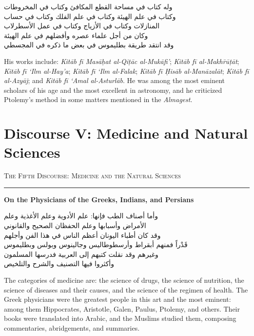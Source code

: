\documentclass[11pt,a4paper]{article}
\newcommand{\ar}[1]{{\arabicfont\beginR #1\endR}}
\newcommand{\bilingual}[2]{%
  \noindent
  \begin{minipage}[t]{0.47\textwidth}
    \vspace{0pt}
    \begin{flushright}
    {\arabicfont\beginR #1\endR}
    \end{flushright}
  \end{minipage}%
  \hfill\vline\hfill
  \begin{minipage}[t]{0.47\textwidth}
    \vspace{0pt}
    #2
  \end{minipage}%
  \par\vspace{0.8em}
}
\newcommand{\bilingualsection}[2]{%
  \vspace{1em}%
  \noindent
  \begin{minipage}[t]{0.47\textwidth}
    \begin{flushright}
    \textsc{\color{sectioncolor}\ar{#1}}
    \end{flushright}
  \end{minipage}%
  \hfill
  \begin{minipage}[t]{0.47\textwidth}
    \textsc{\color{sectioncolor}#2}
  \end{minipage}%
  \par\vspace{0.5em}\hrule\vspace{0.8em}%
}
\newcommand{\bilingualsubsection}[2]{%
  \vspace{0.6em}%
  \noindent
  \begin{minipage}[t]{0.47\textwidth}
    \begin{flushright}
    \textbf{\color{sectioncolor}\ar{#1}}
    \end{flushright}
  \end{minipage}%
  \hfill
  \begin{minipage}[t]{0.47\textwidth}
    \textbf{\color{sectioncolor}#2}
  \end{minipage}%
  \par\vspace{0.4em}%
}
\begin{document}
\vspace{0.5em}
\bilingual
{وله كتاب في مساحة القطع المكافئ وكتاب في المخروطات\\
وكتاب في علم الهيئة وكتاب في علم الفلك وكتاب في حساب\\
المنازلات وكتاب في الأزياج وكتاب في عمل الأسطرلاب\\
وكان من أجل علماء عصره وأفضلهم في علم الهيئة\\
وقد انتقد طريقة بطليموس في بعض ما ذكره في المجسطي}
{His works include: \textit{Kit\=ab f\=i Mas\=a\d{h}at al-Qi\d{t}\={a}c
al-Muk\=afi'}; \textit{Kit\=ab f\=i al-Makh\=r\=u\d{t}\=at};
\textit{Kit\=ab f\=i \textquoteleft Ilm al-Hay'a}; \textit{Kit\=ab f\=i
\textquoteleft Ilm al-Falak}; \textit{Kit\=ab f\=i \d{H}is\=ab
al-Man\=azal\=at}; \textit{Kit\=ab f\=i al-Azy\=aj}; and \textit{Kit\=ab
f\=i \textquoteleft Amal al-Asturl\=ab}. He was among the most eminent
scholars of his age and the most excellent in astronomy, and he criticized
Ptolemy's method in some matters mentioned in the \textit{Almagest}.}

\newpage

\section{Discourse V: Medicine and Natural Sciences}
\label{sec:V}

\bilingualsection{الفن الخامس في الطب والعلوم الطبيعية}{The Fifth Discourse: Medicine and the Natural Sciences}

\bilingualsubsection{في أطباء اليونان والهنود والفرس}{On the Physicians of the Greeks, Indians, and Persians}

\bilingual
{وأما أصناف الطب فإنها: علم الأدوية وعلم الأغذية وعلم\\
الأمراض وأسبابها وعلم الحفظان الصحيح والقانوني\\
وقد كان أطباء اليونان أعظم الناس في هذا الفن وأجلهم\\
قَدْراً فمنهم أبقراط وأرسطوطاليس وجالينوس وبولس وبطليموس\\
وغيرهم وقد نقلت كتبهم إلى العربية فدرسها المسلمون\\
وأكثروا فيها التصنيف والشرح والتلخيص}
{The categories of medicine are: the science of drugs, the science of
nutrition, the science of diseases and their causes, and the science of
the regimen of health. The Greek physicians were the greatest people in
this art and the most eminent: among them Hippocrates, Aristotle, Galen,
Paulus, Ptolemy, and others. Their books were translated into Arabic, and
the Muslims studied them, composing commentaries, abridgements, and
summaries.}
\end{document}

